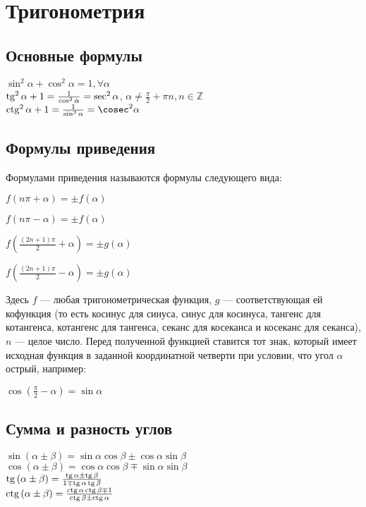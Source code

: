 \section{Тригонометрия}


\subsection{Основные формулы}

$\sin^2 \alpha + \cos^2 \alpha = 1 ,  \forall \alpha $ \\
$\operatorname{tg}^2 \alpha + 1 = \frac{1}{\cos^2 \alpha} = \sec^2 \alpha $, $\alpha \neq \frac{\pi}{2} + \pi n, n \in \mathbb Z $ \\
$\ctg^2 \alpha + 1 = \frac{1}{\sin^2 \alpha} = \cosec^2 \alpha$ \\

\subsection{Формулы приведения}

Формулами приведения называются формулы следующего вида:

$ f ( n \pi + \alpha )  = \pm  f (\alpha)$

$ f ( n \pi - \alpha )  = \pm  f (\alpha)$

$ f \left(  \frac{(2n+1) \pi}{2} + \alpha\right)  = \pm  g (\alpha)$

$ f \left(  \frac{(2n+1) \pi}{2} - \alpha\right)  = \pm  g (\alpha)$

Здесь $f$ — любая тригонометрическая функция, $ g $ — соответствующая ей кофункция (то есть косинус для синуса, синус для косинуса, тангенс для котангенса, котангенс для тангенса, секанс для косеканса и косеканс для секанса), $ n $ — целое число. Перед полученной функцией ставится тот знак, который имеет исходная функция в заданной координатной четверти при условии, что угол $ \alpha $ острый, например:

$ \cos \left(  \frac{ \pi}{2} - \alpha \right)  =   \sin \alpha$

\subsection{Сумма и разность углов}

$\sin \left( \alpha \pm \beta \right) = \sin \alpha \cos \beta \pm \cos \alpha \sin \beta$ \\
$\cos \left( \alpha \pm \beta \right) = \cos \alpha \cos \beta \mp \sin \alpha \sin \beta$ \\
$\operatorname{tg} \left( \alpha \pm \beta \right) = \frac{ \operatorname{tg} \alpha \pm \operatorname{tg} \beta}{1 \mp \operatorname{tg} \alpha \operatorname{tg}\beta}$ \\
$\operatorname{ctg} \left( \alpha \pm \beta \right) = \frac{ \operatorname{ctg} \alpha \operatorname{ctg} \beta \mp 1}{\operatorname{ctg} \beta \pm \operatorname{ctg}\alpha}$ \\


